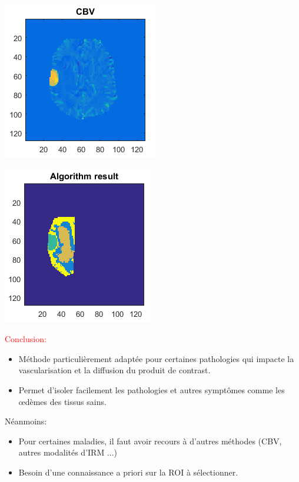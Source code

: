 \documentclass{beamer}
\begin{document}
\begin{frame}
\centering

\includegraphics[scale=0.8]{Patient4Result-CBV.png}

\end{frame}

\begin{frame}
\centering

\includegraphics[scale=0.8]{Patient4Result-ALGO.png}

\end{frame}


\begin{frame}

\textcolor{red}{Conclusion:}

\begin{itemize}
\item Méthode particulièrement adaptée pour certaines pathologies qui impacte la vascularisation et la diffusion du produit de contrast.
\item Permet d'isoler facilement les pathologies et autres symptômes comme les œdèmes des tissus sains.
\end{itemize}

Néanmoins:

\begin{itemize}
\item Pour certaines maladies, il faut avoir recours à d'autres méthodes (CBV, autres modalités d'IRM ...)
\item Besoin d'une connaissance a priori sur la ROI à sélectionner.
\end{itemize}


\end{frame}
\end{document}
